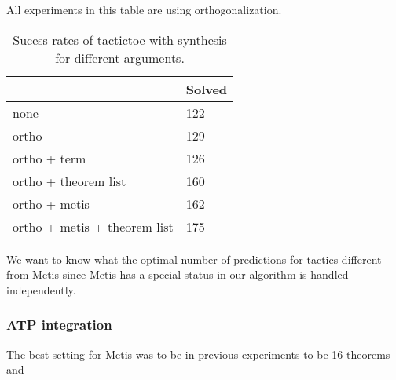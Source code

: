 \documentclass[runningheads,a4paper,draft]{svjour3}
\def\metis{\textsf{Metis}\xspace}
\def\tactictoe{\textsf{TacticToe}\xspace}
\newcommand{\ra}[1]{\renewcommand{\arraystretch}{#1}}
\begin{document}
All experiments in this table are using orthogonalization.
\begin{table}[t]
\centering\ra{1.3}
\small
\begin{tabular}{ll}
\toprule
  & Solved \\
\midrule
 none & 122\\
 ortho & 129\\
 ortho + term & 126\\    
 ortho + theorem list & 160\\
 ortho + metis & 162\\
 ortho + metis + theorem list & 175\\ 
\bottomrule
\end{tabular}
\caption{\label{tab:cfot_param}
Sucess rates of tactictoe with synthesis for different arguments.}
\end{table}
We want to know what the optimal number of predictions for tactics different 
from \metis since \metis has a special status in our algorithm is handled 
independently.

\subsubsection{ATP integration}


The best setting for \metis was to be in previous experiments to be 16
theorems and
\end{document}
